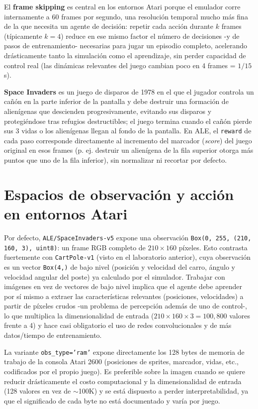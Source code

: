 \documentclass[11pt]{article}
\begin{document}
El \textbf{frame skipping} es central en los entornos Atari porque el emulador corre internamente a
60 frames por segundo, una resoluci\'on temporal mucho m\'as fina de la que necesita un agente de
decisi\'on: repetir cada acci\'on durante $k$ frames (t\'ipicamente $k=4$) reduce en ese mismo
factor el n\'umero de decisiones -y de pasos de entrenamiento- necesarias para jugar un episodio
completo, acelerando dr\'asticamente tanto la simulaci\'on como el aprendizaje, sin perder
capacidad de control real (las din\'amicas relevantes del juego cambian poco en 4 frames = $1/15$s).

\textbf{Space Invaders} es un juego de disparos de 1978 en el que el jugador controla un ca\~n\'on
en la parte inferior de la pantalla y debe destruir una formaci\'on de alien\'igenas que descienden
progresivamente, evitando sus disparos y protegi\'endose tras refugios destructibles; el juego
termina cuando el ca\~n\'on pierde sus 3 vidas o los alien\'igenas llegan al fondo de la pantalla.
En ALE, el \texttt{reward} de cada paso corresponde directamente al incremento del marcador
(\textit{score}) del juego original en esos frames (p. ej. destruir un alien\'igena de la fila
superior otorga m\'as puntos que uno de la fila inferior), sin normalizar ni recortar por defecto.

\section{Espacios de observaci\'on y acci\'on en entornos Atari}

Por defecto, \texttt{ALE/SpaceInvaders-v5} expone una observaci\'on \texttt{Box(0, 255, (210, 160,
3), uint8)}: un frame RGB completo de $210\times160$ p\'ixeles. Esto contrasta fuertemente con
\texttt{CartPole-v1} (visto en el laboratorio anterior), cuya observaci\'on es un vector
\texttt{Box(4,)} de bajo nivel (posici\'on y velocidad del carro, \'angulo y velocidad angular del
poste) ya calculado por el simulador. Trabajar con im\'agenes en vez de vectores de bajo nivel
implica que el agente debe aprender por s\'i mismo a extraer las caracter\'isticas relevantes
(posiciones, velocidades) a partir de p\'ixeles crudos -un problema de percepci\'on adem\'as de uno
de control-, lo que multiplica la dimensionalidad de entrada ($210\times160\times3 = 100{,}800$
valores frente a 4) y hace casi obligatorio el uso de redes convolucionales y de m\'as datos/tiempo
de entrenamiento.

La variante \texttt{obs\_type='ram'} expone directamente los 128 bytes de memoria de trabajo de la
consola Atari 2600 (posiciones de sprites, marcador, vidas, etc., codificados por el propio juego).
Es preferible sobre la imagen cuando se quiere reducir dr\'asticamente el costo computacional y la
dimensionalidad de entrada (128 valores en vez de $\sim$100K) y se est\'a dispuesto a perder
interpretabilidad, ya que el significado de cada byte no est\'a documentado y var\'ia por juego.
\end{document}
